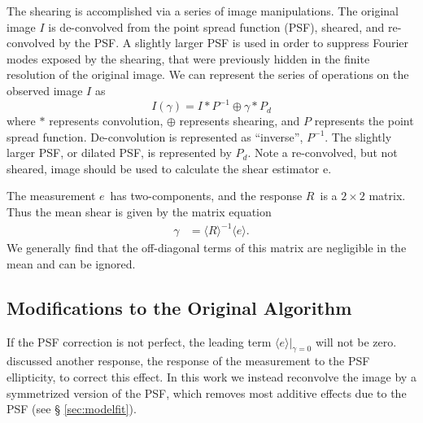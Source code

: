 \documentclass[a4paper,fleqn,usenatbib]{mnras}
\newcommand{\est}{$e$}
\newcommand{\mest}{e}
\newcommand{\mcalR}{$R$}
\newcommand{\mcalRpsf}{$R^{p}$}
\begin{document}
The shearing is accomplished via a series of image manipulations. The original
image $I$ is de-convolved from the point spread function (PSF), sheared, and
re-convolved by the PSF.  A slightly larger PSF is used in order to suppress
Fourier modes exposed by the shearing, that were previously hidden in the
finite resolution of the original image.  We can represent the series of
operations on the observed image $I$ as
\begin{equation}
    I(\gamma) = I \ast P^{-1} \oplus \gamma \ast P_{d}
\end{equation}
where $\ast $ represents convolution, $\oplus$ represents shearing,
and $P$ represents the point spread function.  De-convolution
is represented as ``inverse'', $P^{-1}$.  The slightly larger PSF, or
dilated PSF, is represented by $P_{d}$.
Note a re-convolved, but not sheared, image should be used
to calculate the shear estimator \mest.



The measurement \est\ has two-components, and the response \mcalR\ is
a $2 \times 2$ matrix. Thus the mean shear is given by the matrix
equation
\begin{align}
    \gamma &= 
    \langle \mbox{\mcalR} \rangle^{-1} \langle \mest \rangle.
\end{align}
We generally find that the off-diagonal terms of this matrix are negligible in the mean
and can be ignored.

\subsection{Modifications to the Original Algorithm}

If the PSF correction is not perfect, the leading term $\langle \mest
\rangle|_{\gamma=0}$ will not be zero.  \cite{HuffMcal} discussed another
response, the response of the measurement to the PSF ellipticity, to correct
this effect.  In this work we instead reconvolve the image by a symmetrized
version of the PSF, which removes most additive effects due to the PSF  (see \S
\ref{sec:modelfit}).
\end{document}
